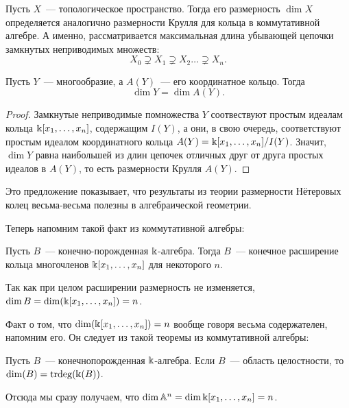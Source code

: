 	Пусть $X$~--- топологическое пространство. Тогда его размерность $\dim{X}$ определяется аналогично размерности Крулля для кольца в коммутативной алгебре. А именно, рассматривается максимальная длина убывающей цепочки замкнутых неприводимых множеств: 
	\[
		X_0 \supsetneq X_1 \supsetneq X_2 \ldots \supsetneq X_n.
	\]

	\begin{statement} 
		Пусть $Y$~--- многообразие, а $A(Y)$~--- его координатное кольцо. Тогда 
	\[
		\dim{Y} = \dim{A(Y)}.
	\]	
	\end{statement}
	\begin{proof}
		Замкнутые неприводимые помножества $Y$ соотвествуют простым идеалам кольца $\Bbbk[x_1, \ldots, x_n]$, содержащим $I(Y)$, а они, в свою очередь, соответствуют простым идеалом координатного кольца $A(Y) = \Bbbk[x_1, \ldots, x_n]/I(Y)$. Значит, $\dim{Y}$ равна наибольшей из длин цепочек отличных друг от друга простых идеалов в $A(Y)$, то есть размерности Крулля $A(Y)$. 
	\end{proof}

	Это предложение показывает, что результаты из теории размерности Нётеровых колец весьма-весьма полезны в алгебраической геометрии. 

	Теперь напомним такой факт из коммутативной алгебры: 

	\begin{theorem} 
		Пусть $B$~--- конечно-порожденная $\Bbbk$-алгебра. Тогда $B$~--- конечное расширение кольца многочленов $\Bbbk[x_1, \ldots, x_n]$ для некоторого $n$. 
	\end{theorem}

	Так как при целом расширении размерность не изменяется, $\dim{B} = \dim(\Bbbk[x_1, \ldots, x_n]) = n$. 

	Факт о том, что $\dim(\Bbbk[x_1, \ldots, x_n]) = n$ вообще говоря весьма содержателен, напомним его. Он следует из такой теоремы из коммутативной алгебры:

	\begin{theorem}\label{dim_tr_deg}
		Пусть $B$~--- конечнопорожденная $\Bbbk$-алгебра. Если $B$~--- область целостности, 	то $\dim(B) = \mathrm{trdeg}(\Bbbk(B))$.
	\end{theorem}

	\begin{example}
		Отсюда мы сразу получаем, что $\dim{\mathbb{A}^n} = \dim{\Bbbk[x_1, \ldots, x_n]} = n$. 
	\end{example}
	




		
	



	